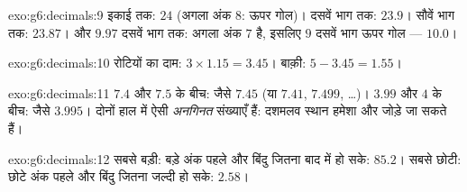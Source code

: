 \begin{solution}{exo:g6:decimals:9}
इकाई तक: $24$ (अगला अंक $8$: ऊपर गोल)। दसवें भाग तक: $23.9$।
सौवें भाग तक: $23.87$। और $9.97$ दसवें भाग तक: अगला अंक
$7$ है, इसलिए $9$ दसवें भाग ऊपर गोल --- $10.0$।
\end{solution}

\begin{solution}{exo:g6:decimals:10}
रोटियों का दाम: $3 \times 1.15 = 3.45$। बाक़ी:
$5 - 3.45 = 1.55$।
\end{solution}

\begin{solution}{exo:g6:decimals:11}
$7.4$ और $7.5$ के बीच: जैसे $7.45$ (या $7.41$, $7.499$,
\dots)। $3.99$ और $4$ के बीच: जैसे $3.995$। दोनों हाल में ऐसी
\emph{अनगिनत} संख्याएँ हैं: दशमलव स्थान हमेशा और जोड़े जा सकते
हैं।
\end{solution}

\begin{solution}{exo:g6:decimals:12}
सबसे बड़ी: बड़े अंक पहले और बिंदु जितना बाद में हो सके:
$85.2$। सबसे छोटी: छोटे अंक पहले और बिंदु जितना जल्दी हो सके:
$2.58$।
\end{solution}

